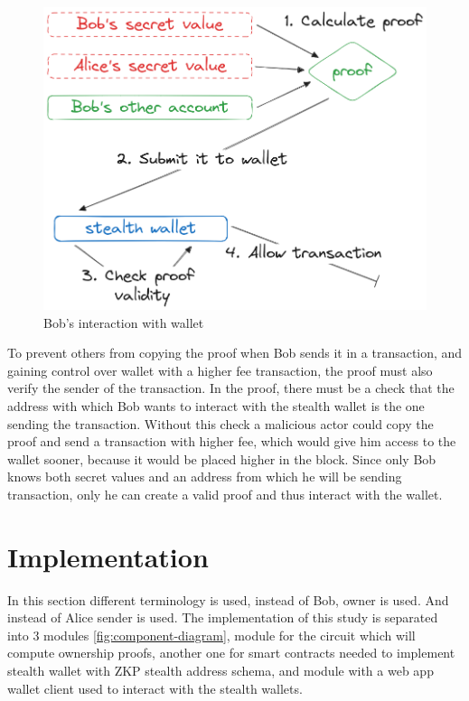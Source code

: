 \documentclass[conference,comsoc,10pt]{IEEEtran}
\begin{document}
    \begin{figure}[h]
        \centering
        \includegraphics[scale=0.25]{./assets/images/interating-with-wallet.png}
        \caption{Bob's interaction with wallet}
        \label{fig:wallet-interaction}
    \end{figure}

    To prevent others from copying the proof when Bob sends it in a transaction,
    and gaining control over wallet with a higher fee transaction, the proof
    must also verify the sender of the transaction. In the proof, there must
    be a check that the address with which Bob wants to interact with the
    stealth wallet is the one sending the transaction. Without this check a malicious
    actor could copy the proof and send a transaction with higher fee, which would
    give him access to the wallet sooner, because it would be placed higher in
    the block. Since only Bob knows both secret values and an address from which
    he will be sending transaction, only he can create a valid proof and thus
    interact with the wallet.

\section{Implementation}\label{implementation}

    In this section different terminology is used, instead of Bob, owner is used.
    And instead of Alice sender is used. The implementation of this study is
    separated into 3 modules \ref{fig:component-diagram}, module for the
    circuit which will compute ownership proofs, another one for smart contracts
    needed to implement stealth wallet with ZKP stealth address schema, and
    module with a web app wallet client used to interact with the stealth wallets.
\end{document}
